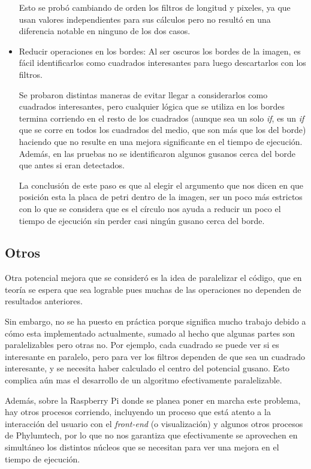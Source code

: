 \documentclass{article}
\begin{document}
\begin{itemize}
Esto se probó cambiando de orden los filtros de longitud y pixeles, ya que usan valores independientes para sus cálculos pero no resultó en una diferencia notable en ninguno de los dos casos.

\item Reducir operaciones en los bordes: Al ser oscuros los bordes de la imagen, es fácil identificarlos como cuadrados interesantes para luego descartarlos con los filtros.

Se probaron distintas maneras de evitar llegar a considerarlos como cuadrados interesantes, pero cualquier lógica que se utiliza en los bordes termina corriendo en el resto de los cuadrados (aunque sea un solo \emph{if}, es un \emph{if} que se corre en todos los cuadrados del medio, que son más que los del borde) haciendo que no resulte en una mejora significante en el tiempo de ejecución. Además, en las pruebas no se identificaron algunos gusanos cerca del borde que antes si eran detectados.

La conclusión de este paso es que al elegir el argumento que nos dicen en que posición esta la placa de petri dentro de la imagen, ser un poco más estrictos con lo que se considera que es el círculo nos ayuda a reducir un poco el tiempo de ejecución sin perder casi ningún gusano cerca del borde.
\end{itemize}

\subsection{Otros}
Otra potencial mejora que se consideró es la idea de paralelizar el código, que en teoría se espera que sea lograble pues muchas de las operaciones no dependen de resultados anteriores.

Sin embargo, no se ha puesto en práctica porque significa mucho trabajo debido a cómo esta implementado actualmente, sumado al hecho que algunas partes son paralelizables pero otras no. Por ejemplo, cada cuadrado se puede ver si es interesante en paralelo, pero para ver los filtros dependen de que sea un cuadrado interesante, y se necesita haber calculado el centro del potencial gusano. Esto complica aún mas el desarrollo de un algoritmo efectivamente paralelizable.

Además, sobre la Raspberry Pi donde se planea poner en marcha este problema, hay otros procesos corriendo, incluyendo un proceso que está atento a la interacción del usuario con el \emph{front-end} (o visualización) y algunos otros procesos de Phylumtech, por lo que no nos garantiza que efectivamente se aprovechen en simultáneo los distintos núcleos que se necesitan para ver una mejora en el tiempo de ejecución.
\end{document}
